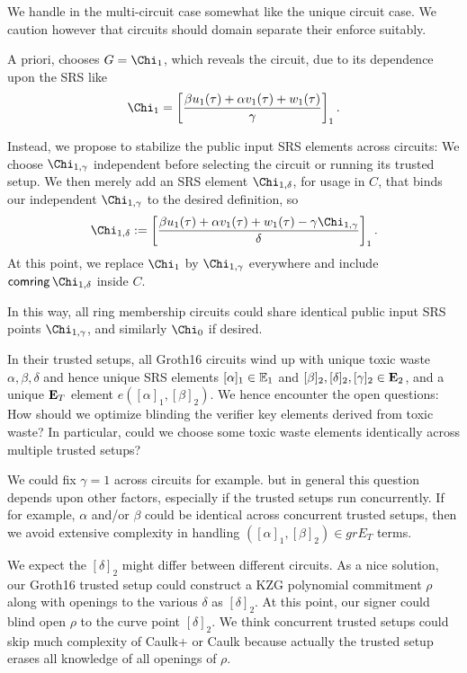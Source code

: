 We handle \comring in the multi-circuit case somewhat like the
unique circuit case.  We caution however that circuits should domain
separate their enforce \comring suitably.

\smallskip

A priori, \pifast chooses $\genG = \Chi_1$, which reveals the circuit,
due to its dependence upon the SRS like
$$ \Chi_1 = \left[ {\beta u_1(\tau) + \alpha v_1(\tau) + w_1(\tau) \over \gamma} \right]_1 \mathperiod $$

Instead, we propose to stabilize the public input SRS elements across circuits:
We choose $\Chi_{1,\gamma}$ independent before selecting the circuit
or running its trusted setup.
We then merely add an SRS element $\Chi_{1,\delta}$, for usage in $C$, that binds
our independent $\Chi_{1,\gamma}$ to the desired definition, so
$$ \Chi_{1,\delta} := \left[ {\beta u_1(\tau) + \alpha v_1(\tau) + w_1(\tau) - \gamma \Chi_{1,\gamma} \over \delta} \right]_1 \mathperiod $$
At this point, we replace $\Chi_1$ by $\Chi_{1,\gamma}$ everywhere and
include $\comring \, \Chi_{1,\delta}$ inside $C$.

In this way, all ring membership circuits could share identical
public input SRS points $\Chi_{1,\gamma}$, and similarly $\Chi_0$ if desired.

\smallskip

In their trusted setups, all Groth16 circuits wind up with unique
toxic waste $\alpha,\beta,\delta$ and hence unique SRS elements
$[\alpha]_1 \in {\mathbb{E}}_1$ and $[\beta]_2, [\delta]_2, [\gamma]_2 \in {\mathbf{E}}_2$,
and a unique ${\mathbf{E}}_T$ element $e([\alpha]_1, [\beta]_2)$.
We hence encounter the open questions:
How should we optimize blinding the verifier key elements derived from toxic waste?
In particular, could we choose some toxic waste elements identically across multiple trusted setups?

We could fix $\gamma=1$ across circuits for example. but in general
this question depends upon other factors, especially if the trusted setups
run concurrently.
If for example, $\alpha$ and/or $\beta$ could be identical across
concurrent trusted setups, then we avoid extensive complexity in
 handling $([\alpha]_1, [\beta]_2) \in grE_T$ terms.

We expect the $[\delta]_2$ might differ between different circuits.
As a nice solution, our Groth16 trusted setup could construct a
KZG polynomial commitment $\rho$ along with openings to the
various $\delta$ as $[\delta]_2$.  At this point, our signer could
blind open $\rho$ to the curve point $[\delta]_2$.
We think concurrent trusted setups could skip much complexity of
Caulk+ \cite{caulk+} or Caulk \cite{caulk} because actually the
 trusted setup erases all knowledge of all openings of $\rho$.

\endinput



\subsection{Post-quantum}





\subsection{SnarkPack}

TODO: Handle $\pi$ hashes?


